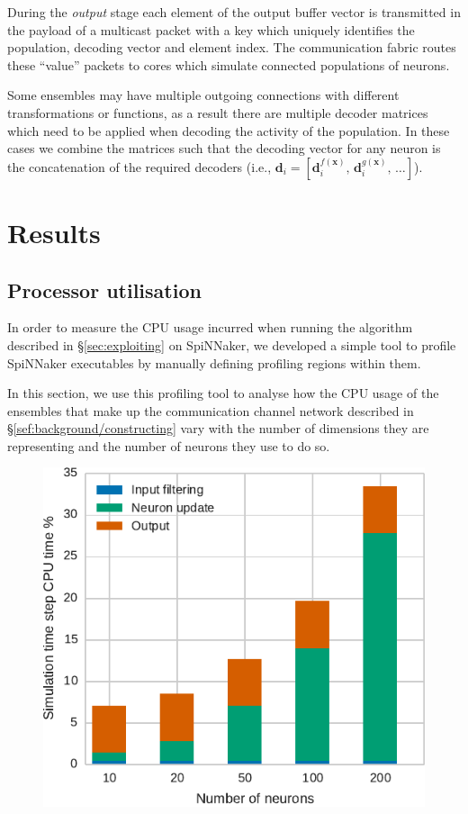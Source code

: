 \documentclass[conference]{IEEEtran}
\renewcommand{\vec}{\mathbf}  %
\begin{document}
  During the \textit{output} stage each element of the output buffer vector is transmitted in the payload of a multicast packet with a key which uniquely identifies the population, decoding vector and element index.
  The communication fabric routes these ``value'' packets to cores which simulate connected populations of neurons.

  Some ensembles may have multiple outgoing connections with different transformations or functions, as a result there are multiple decoder matrices which need to be applied when decoding the activity of the population.
  In these cases we combine the matrices such that the decoding vector for any neuron is the concatenation of the required decoders
  (i.e., $\vec{d}_i = \left[\vec{d}_i^{f(\vec{x})},\,\vec{d}_i^{g(\vec{x})},\,\ldots \right]$).

  \section{Results}
  \label{sec:results}

  \subsection{Processor utilisation}
In order to measure the CPU usage incurred when running the algorithm described in \S\ref{sec:exploiting} on SpiNNaker, we developed a simple tool to profile SpiNNaker executables by manually defining profiling regions within them.

In this section, we use this profiling tool to analyse how the CPU usage of the ensembles that make up the communication channel network described in \S\ref{sef:background/constructing} vary with the number of dimensions they are representing and the number of neurons they use to do so.

  \begin{figure}[!t]
    \includegraphics{figures/comm_channel_cpu_16d_bar}
    \caption{}
    \label{fig:results/comm-channel-cpu-16d}
  \end{figure}
  
\end{document}
